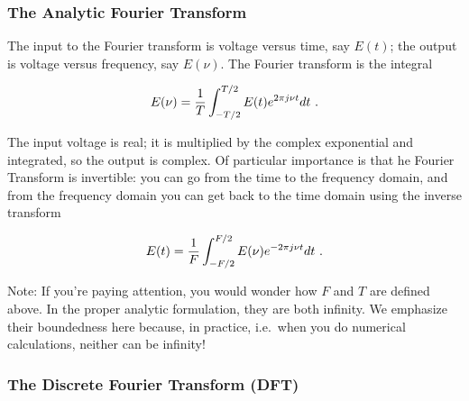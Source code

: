 \documentclass[11pt]{article}
\begin{document}
\subsubsection{The Analytic Fourier Transform}

        The input to the Fourier transform is voltage versus time, say
$E(t)$; the output is voltage versus frequency, say $E(\nu)$.  The Fourier
transform is the integral
 
\begin{equation} \label{ift}
E(\nu) = {1 \over T} \int_{-T/2}^{T/2} E(t) e^{2 \pi j \nu t} dt \ .
\end{equation}
 
\noindent The input voltage is real; it is multiplied by the complex
exponential and integrated, so the output is complex. Of particular
importance is that he Fourier Transform is invertible: you can go
from the time to the frequency domain, and from the frequency domain you can
get back to the time domain using the inverse transform

\begin{equation}
E(t) = {1 \over F} \int_{-F/2}^{F/2} E(\nu) e^{-2 \pi j \nu t} dt \ .
\end{equation}
 
\noindent Note: If you're paying attention, you would wonder how
$F$ and $T$ are defined above. In the proper analytic formulation, they
are both infinity. We emphasize their boundedness here because, in
practice, i.e.\ when you do numerical calculations, neither can be
infinity!

\subsubsection{The Discrete Fourier Transform (DFT)} \label{dft}
\end{document}
